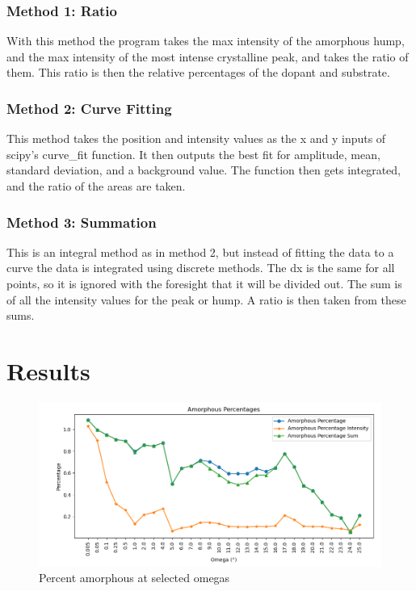 \documentclass{article}
\begin{document}
\begin{multicols}{2}
    \subsubsection*{Method 1: Ratio}

        With this method the program takes the max intensity of the amorphous hump, and the max intensity of the most intense crystalline peak, and takes the ratio of them. 
        This ratio is then the relative percentages of the dopant and substrate.

    \subsubsection*{Method 2: Curve Fitting}

        This method takes the position and intensity values as the x and y inputs of scipy's curve\_fit function. 
        It then outputs the best fit for amplitude, mean, standard deviation, and a background value. 
        The function then gets integrated, and the ratio of the areas are taken.

    \subsubsection*{Method 3: Summation}

        This is an integral method as in method 2, but instead of fitting the data to a curve the data is integrated using discrete methods. 
        The dx is the same for all points, so it is ignored with the foresight that it will be divided out. 
        The sum is of all the intensity values for the peak or hump. 
        A ratio is then taken from these sums.

\section{Results}
    
    \begin{figure}[H]
        \centering
        \includegraphics[width=\linewidth]{Mixture Line Graph (amorphous)_final.png}
        \caption{Percent amorphous at selected omegas}
        \label{fig:line graph amorphous}
    \end{figure}


\end{multicols}
\end{document}
